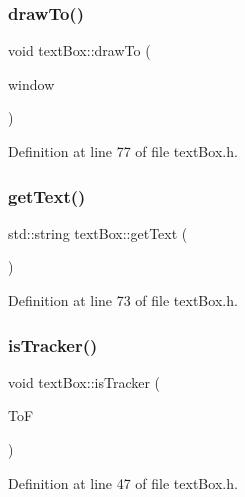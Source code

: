 \subsubsection{\texorpdfstring{draw\+To()}{drawTo()}}
{\footnotesize\ttfamily void text\+Box\+::draw\+To (\begin{DoxyParamCaption}\item[{sf\+::\+Render\+Window \&}]{window }\end{DoxyParamCaption})\hspace{0.3cm}{\ttfamily [inline]}}



Definition at line 77 of file text\+Box.\+h.

\mbox{\label{classtext_box_a71136cb45321e5620ef8ab9e1ace7348}} 
\subsubsection{\texorpdfstring{get\+Text()}{getText()}}
{\footnotesize\ttfamily std\+::string text\+Box\+::get\+Text (\begin{DoxyParamCaption}{ }\end{DoxyParamCaption})\hspace{0.3cm}{\ttfamily [inline]}}



Definition at line 73 of file text\+Box.\+h.

\mbox{\label{classtext_box_a9b5a0f5e721811f899659436ff5707d0}} 
\subsubsection{\texorpdfstring{is\+Tracker()}{isTracker()}}
{\footnotesize\ttfamily void text\+Box\+::is\+Tracker (\begin{DoxyParamCaption}\item[{bool}]{ToF }\end{DoxyParamCaption})\hspace{0.3cm}{\ttfamily [inline]}}



Definition at line 47 of file text\+Box.\+h.

\mbox{\label{classtext_box_a390fb8374ec6fec5dc3a71e9a4257553}} 
